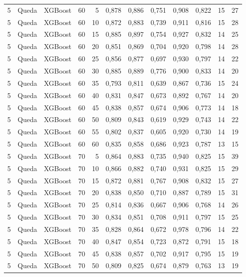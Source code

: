\begin{longtable}{ccclrrrrrrrr}
5 & Queda & XGBoost & 60 & 5 & 0,878 & 0,886 & 0,751 & 0,908 & 0,822 & 15 & 27 \\
5 & Queda & XGBoost & 60 & 10 & 0,872 & 0,883 & 0,739 & 0,911 & 0,816 & 15 & 28 \\
5 & Queda & XGBoost & 60 & 15 & 0,885 & 0,897 & 0,754 & 0,927 & 0,832 & 14 & 25 \\
5 & Queda & XGBoost & 60 & 20 & 0,851 & 0,869 & 0,704 & 0,920 & 0,798 & 14 & 28 \\
5 & Queda & XGBoost & 60 & 25 & 0,856 & 0,877 & 0,697 & 0,930 & 0,797 & 14 & 22 \\
5 & Queda & XGBoost & 60 & 30 & 0,885 & 0,889 & 0,776 & 0,900 & 0,833 & 14 & 20 \\
5 & Queda & XGBoost & 60 & 35 & 0,793 & 0,811 & 0,639 & 0,867 & 0,736 & 15 & 24 \\
5 & Queda & XGBoost & 60 & 40 & 0,831 & 0,847 & 0,673 & 0,892 & 0,767 & 14 & 20 \\
5 & Queda & XGBoost & 60 & 45 & 0,838 & 0,857 & 0,674 & 0,906 & 0,773 & 14 & 18 \\
5 & Queda & XGBoost & 60 & 50 & 0,809 & 0,843 & 0,619 & 0,929 & 0,743 & 14 & 22 \\
5 & Queda & XGBoost & 60 & 55 & 0,802 & 0,837 & 0,605 & 0,920 & 0,730 & 14 & 19 \\
5 & Queda & XGBoost & 60 & 60 & 0,835 & 0,858 & 0,686 & 0,923 & 0,787 & 13 & 15 \\
5 & Queda & XGBoost & 70 & 5 & 0,864 & 0,883 & 0,735 & 0,940 & 0,825 & 15 & 39 \\
5 & Queda & XGBoost & 70 & 10 & 0,866 & 0,882 & 0,740 & 0,931 & 0,825 & 15 & 29 \\
5 & Queda & XGBoost & 70 & 15 & 0,872 & 0,881 & 0,767 & 0,908 & 0,832 & 15 & 27 \\
5 & Queda & XGBoost & 70 & 20 & 0,838 & 0,850 & 0,710 & 0,887 & 0,789 & 15 & 31 \\
5 & Queda & XGBoost & 70 & 25 & 0,814 & 0,836 & 0,667 & 0,906 & 0,768 & 14 & 26 \\
5 & Queda & XGBoost & 70 & 30 & 0,834 & 0,851 & 0,708 & 0,911 & 0,797 & 15 & 25 \\
5 & Queda & XGBoost & 70 & 35 & 0,828 & 0,864 & 0,672 & 0,978 & 0,796 & 14 & 22 \\
5 & Queda & XGBoost & 70 & 40 & 0,847 & 0,854 & 0,723 & 0,872 & 0,791 & 15 & 18 \\
5 & Queda & XGBoost & 70 & 45 & 0,838 & 0,857 & 0,702 & 0,917 & 0,795 & 15 & 19 \\
5 & Queda & XGBoost & 70 & 50 & 0,809 & 0,825 & 0,674 & 0,879 & 0,763 & 13 & 19 \\

\end{longtable}
